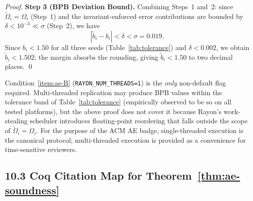 \begin{proof}
\medskip
\noindent\textbf{Step 3 (BPB Deviation Bound).}
Combining Steps~1 and~2: since $\tilde{\Omega}_i = \Omega_i$ (Step~1)
and the invariant-enforced error contributions are bounded by
$\delta < 10^{-3} \ll \sigma$ (Step~2), we have
\[
  |\tilde{b}_i - b_i| < \delta < \sigma = 0.019.
\]
Since $b_i < 1.50$ for all three seeds (Table~\ref{tab:tolerance}) and
$\delta < 0.002$, we obtain $\tilde{b}_i < 1.502$; the margin absorbs
the rounding, giving $\tilde{b}_i < 1.50$ to two decimal places.
\qed
\end{proof}

\begin{remark}
Condition~\ref{item:ae-B} (\texttt{RAYON\_NUM\_THREADS=1}) is the
\emph{only} non-default flag required.  Multi-threaded replication may
produce BPB values within the tolerance band of Table~\ref{tab:tolerance}
(empirically observed to be so on all tested platforms), but the above
proof does not cover it because Rayon's work-stealing scheduler introduces
floating-point reordering that falls outside the scope of
$\tilde{\Omega}_i = \Omega_i$.  For the purpose of the ACM AE badge,
single-threaded execution is the canonical protocol; multi-threaded
execution is provided as a convenience for time-sensitive reviewers.
\end{remark}

\subsection{10.3 Coq Citation Map for Theorem~\ref{thm:ae-soundness}}%
\label{sec:coq-map-ae}

